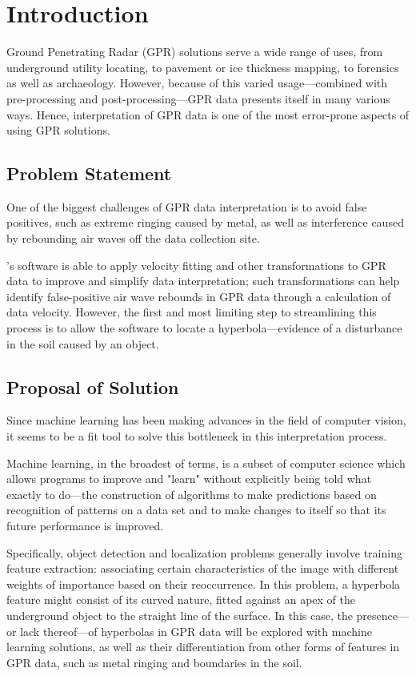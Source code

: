 \documentclass[se,blockletter]{uw-wkrpt}
\begin{document}
\section{Introduction}\label{sec:intro}
Ground Penetrating Radar (GPR) solutions serve a wide range of uses, from underground utility locating, to pavement or ice thickness mapping, to forensics as well as archaeology. However, because of this varied usage---combined with pre-processing and post-processing---GPR data presents itself in many various ways. Hence, interpretation of GPR data is one of the most error-prone aspects of using GPR solutions.

\subsection{Problem Statement}
One of the biggest challenges of GPR data interpretation is to avoid false positives, such as extreme ringing caused by metal, as well as interference caused by rebounding air waves off the data collection site.

\thecompany{}'s software is able to apply velocity fitting and other transformations to GPR data to improve and simplify data interpretation; such transformations can help identify false-positive air wave rebounds in GPR data through a calculation of data velocity. However, the first and most limiting step to streamlining this process is to allow the software to locate a hyperbola---evidence of a disturbance in the soil caused by an object.

\subsection{Proposal of Solution}
Since machine learning has been making advances in the field of computer vision, it seems to be a fit tool to solve this bottleneck in this interpretation process.

Machine learning, in the broadest of terms, is a subset of computer science which allows programs to improve and "learn" without explicitly being told what exactly to do---the construction of algorithms to make predictions based on recognition of patterns on a data set and to make changes to itself so that its future performance is improved. 

Specifically, object detection and localization problems generally involve training feature extraction: associating certain characteristics of the image with different weights of importance based on their reoccurrence. In this problem, a hyperbola feature might consist of its curved nature, fitted against an apex of the underground object to the straight line of the surface. In this case, the presence---or lack thereof---of hyperbolas in GPR data will be explored with machine learning solutions, as well as their differentiation from other forms of features in GPR data, such as metal ringing and boundaries in the soil.
\end{document}
